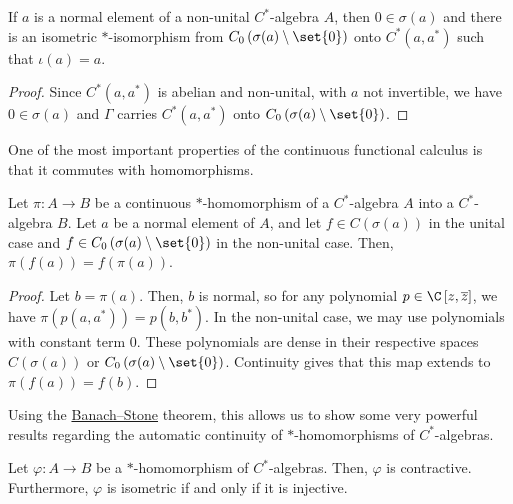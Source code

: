 \documentclass[10pt]{mypackage}
\begin{document}
\begin{corollary}
  If $a$ is a normal element of a non-unital $C^{\ast}$-algebra $A$, then $0\in \sigma(a)$ and there is an isometric $\ast$-isomorphism from $C_0\left(\sigma(a)\setminus \set{0}\right)$ onto $C^{\ast}\left( a,a^{\ast} \right)$ such that $\iota(a) = a$.
\end{corollary}
\begin{proof}
  Since $C^{\ast}\left(a,a^{\ast}\right)$ is abelian and non-unital, with $a$ not invertible, we have $0\in \sigma(a)$ and $\Gamma$ carries $C^{\ast}\left( a,a^{\ast} \right)$ onto $C_0\left( \sigma(a)\setminus \set{0} \right)$.
\end{proof}
One of the most important properties of the continuous functional calculus is that it commutes with homomorphisms.
\begin{corollary}
  Let $\pi\colon A\rightarrow B$ be a continuous $\ast$-homomorphism of a $C^{\ast}$-algebra $A$ into a $C^{\ast}$-algebra $B$. Let $a$ be a normal element of $A$, and let $f\in C(\sigma(a))$ in the unital case and $f\in C_0\left( \sigma(a)\setminus \set{0} \right)$ in the non-unital case. Then, $\pi(f(a)) = f(\pi(a))$.
\end{corollary}
\begin{proof}
  Let $b = \pi(a)$. Then, $b$ is normal, so for any polynomial $p\in \C\left[ z, \overline{z} \right]$, we have $\pi\left(p\left(a,a^{\ast}\right)\right) = p\left( b,b^{\ast} \right)$. In the non-unital case, we may use polynomials with constant term $0$. These polynomials are dense in their respective spaces $C(\sigma(a))$ or $C_0\left( \sigma(a)\setminus \set{0} \right)$. Continuity gives that this map extends to $\pi(f(a)) = f(b)$.
\end{proof}
Using the \href{https://ai.avinash-iyer.com/Classes_and_Homework/After\%20College/Other\%20Notes/extreme_points_krein_milman_and_stone_weierstrass.pdf}{Banach--Stone} theorem, this allows us to show some very powerful results regarding the automatic continuity of $\ast$-homomorphisms of $C^{\ast}$-algebras.
\begin{proposition}
  Let $\varphi\colon A\rightarrow B$ be a $\ast$-homomorphism of $C^{\ast}$-algebras. Then, $\varphi$ is contractive. Furthermore, $\varphi$ is isometric if and only if it is injective.
\end{proposition}
\end{document}
